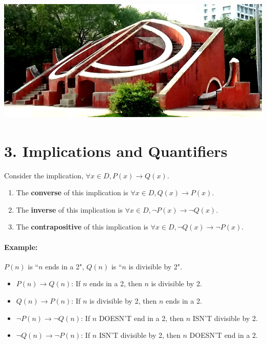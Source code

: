 \documentclass[a4paper,12pt]{book}
\begin{document}
        ~\\~\\
        \begin{center}
            \includegraphics[height=6cm]{images/jantar-mantar.jpg}
        \end{center}
            
    \newpage
    \section*{3. Implications and Quantifiers}

        \begin{introNOHEAD}
            Consider the implication, $\forall x \in D, P(x) \to Q(x)$.

            \begin{enumerate}
                \item The \textbf{converse} of this implication is $\forall x \in D, Q(x) \to P(x)$.
                \item The \textbf{inverse} of this implication is $\forall x \in D, \neg P(x) \to \neg Q(x)$.
                \item The \textbf{contrapositive} of this implication is $\forall x \in D, \neg Q(x) \to \neg P(x)$.
            \end{enumerate}

            \paragraph{Example:} $P(n)$ is ``$n$ ends in a 2", $Q(n)$ is ``$n$ is divisible by 2".

            \begin{itemize}
                \item   $P(n) \to Q(n)$: If $n$ ends in a 2, then $n$ is divisible by 2.
                \item   $Q(n) \to P(n)$: If $n$ is divisible by 2, then $n$ ends in a 2.
                \item   $\neg P(n) \to \neg Q(n)$: If $n$ DOESN'T end in a 2, then $n$ ISN'T divisible by 2.
                \item   $\neg Q(n) \to \neg P(n)$: If $n$ ISN'T divisible by 2, then $n$ DOESN'T end in a 2.
            \end{itemize}
        \end{introNOHEAD}
\end{document}
